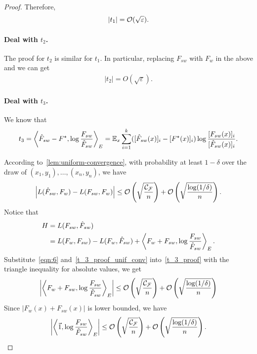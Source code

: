 \begin{proof}
Therefore,
\begin{align} \label{equation_t_1}
    |t_1| = \mathcal{O}(\sqrt{\varepsilon}).
\end{align}


\paragraph{Deal with $t_2$.}
The proof for $t_2$ is similar for $t_1$.
In particular, replacing $F_{sw}$ with $F_w$ in the above and we can get 
\begin{align} \label{equation_t_2}
    |t_2| = O(\sqrt{\varepsilon}).
\end{align}












\paragraph{Deal with $t_3$.}

We know that
$$t_3 = \left \langle \hat{F}_{sw}-F^\star, \log \frac{F_{sw}}{\hat{F}_{sw}} \right \rangle_E = \mathbb{E}_x \sum_{i=1}^k ([\hat{F}_{sw}(x)]_i-[F^\star(x)]_i)\log \frac{[F_{sw}(x)]_i}{[\hat{F}_{sw}(x)]_i}.$$

According to~\cref{lem:uniform-convergence}, 
with probability at least $1-\delta$ over the draw of $(x_1,y_1),\dots,(x_n, y_n)$, we have
\begin{align} \label{t_3_proof_unif_conv}
    \left|L(\hat{F}_{sw}, F_w) - L(F_{sw}, F_w) \right| \le \mathcal{O}\left(\sqrt{\frac{\mathcal{C}_{\mathcal{F}}}{n}}\right) + \mathcal{O}\left(\sqrt{\frac{\log(1/\delta)}{n}}\right).
\end{align}
Notice that 
\begin{align} \label{t_3_proof}
H & = L(F_{sw}, \hat{F}_{sw}) \nonumber \\ & = L(F_w, F_{sw}) - L(F_w, \hat{F}_{sw}) + \left \langle F_w+F_{sw}, \log \frac{F_{sw}}{\hat{F}_{sw}} \right \rangle_E.
\end{align}
Substitute~\eqref{eqn:6} and~\eqref{t_3_proof_unif_conv} into~\cref{t_3_proof} with the triangle inequality for absolute values, we get
\begin{align*}
    \left| \left \langle F_w+F_{sw}, \log \frac{F_{sw}}{\hat{F}_{sw}} \right \rangle_E \right| \le \mathcal{O}\left(\sqrt{\frac{\mathcal{C}_{\mathcal{F}}}{n}}\right) + \mathcal{O}\left(\sqrt{\frac{\log(1/\delta)}{n}}\right)
\end{align*}
Since $|F_w(x)+F_{sw}(x)|$ is lower bounded, we have
$$\left| \left \langle \vec{1}, \log \frac{F_{sw}}{\hat{F}_{sw}} \right \rangle_E \right| \le \mathcal{O}\left(\sqrt{\frac{\mathcal{C}_{\mathcal{F}}}{n}}\right) + \mathcal{O}\left(\sqrt{\frac{\log(1/\delta)}{n}}\right).$$


\end{proof}
